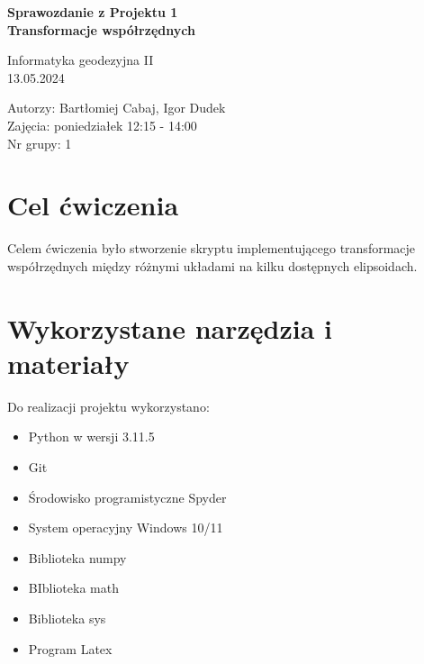 \documentclass[11pt, a4paper]{article}
\begin{document}
	
	\begin{center}
		\huge\textbf{Sprawozdanie z Projektu 1\\
			Transformacje współrzędnych}
	\end{center}
	\begin{center}
		\large Informatyka geodezyjna II \\
		13.05.2024
	\end{center}
	\vspace{\baselineskip}
	\vspace{\baselineskip}
	\vspace{\baselineskip}
	\vspace{\baselineskip}
	\noindent
	\Large Autorzy: Bartłomiej Cabaj, Igor Dudek\\
	Zajęcia: poniedziałek 12:15 - 14:00\\
	Nr grupy: 1\\
	
	\newpage
	\section{Cel ćwiczenia}
	Celem ćwiczenia było stworzenie skryptu implementującego transformacje współrzędnych między różnymi układami na kilku dostępnych elipsoidach.
	
	\section{Wykorzystane narzędzia i materiały}
	Do realizacji projektu wykorzystano:

	
	\begin{itemize}
		\item Python w wersji 3.11.5
		\item Git
		\item Środowisko programistyczne Spyder
		\item System operacyjny Windows 10/11
		\item Biblioteka numpy
		\item BIblioteka math
		\item Biblioteka sys
		\item Program Latex 
	\end{itemize}
	
\end{document}
